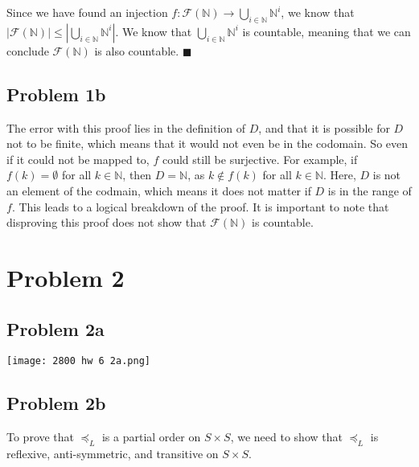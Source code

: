 \documentclass{article}
\begin{document}
Since we have found an injection $f: \mathcal{F}(\mathbb{N}) \rightarrow \bigcup_{i \in \mathbb{N}} \mathbb{N}^i$, we know that $|\mathcal{F}(\mathbb{N})| \leq |\bigcup_{i \in \mathbb{N}} \mathbb{N}^i|$. We know that $\bigcup_{i \in \mathbb{N}} \mathbb{N}^i$ is countable, meaning that we can conclude $\mathcal{F}(\mathbb{N})$ is also countable. $\blacksquare$

\subsection{Problem 1b}

The error with this proof lies in the definition of $D$, and that it is possible for $D$ not to be finite, which means that it would not even be in the codomain. So even if it could not be mapped to, $f$ could still be surjective. For example, if $f(k) = \emptyset$ for all $k \in \mathbb{N}$, then $D = \mathbb{N}$, as $k \notin f(k)$ for all $k \in \mathbb{N}$. Here, $D$ is not an element of the codmain, which means it does not matter if $D$ is in the range of $f$. This leads to a logical breakdown of the proof. It is important to note that disproving this proof does not show that $\mathcal{F}(\mathbb{N})$ is countable.

\section{Problem 2}

\subsection{Problem 2a}

\begin{center}

\texttt{[image: 2800 hw 6 2a.png]}

\end{center}

\subsection{Problem 2b}

To prove that $\preceq_{L}$ is a partial order on $S \times S$, we need to show that $\preceq_{L}$ is reflexive, anti-symmetric, and transitive on $S \times S$.
\end{document}
